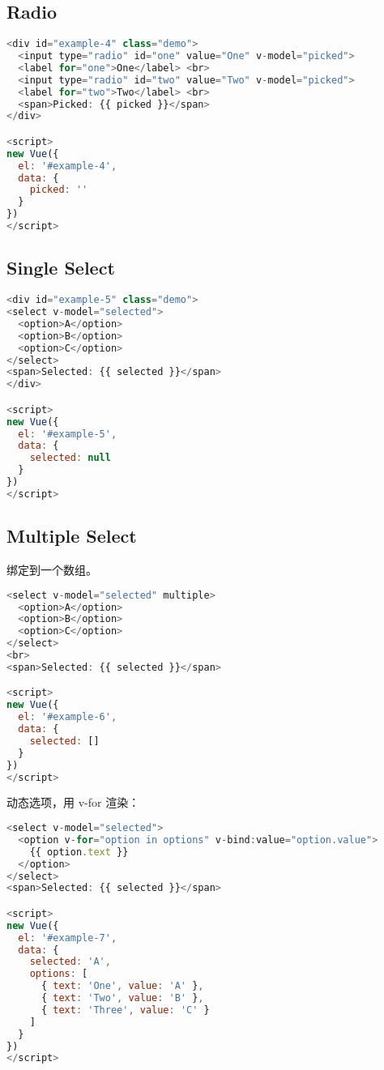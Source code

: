 \subsection{Radio}


\begin{lstlisting}[language=JavaScript]
<div id="example-4" class="demo">
  <input type="radio" id="one" value="One" v-model="picked"> 
  <label for="one">One</label> <br> 
  <input type="radio" id="two" value="Two" v-model="picked"> 
  <label for="two">Two</label> <br> 
  <span>Picked: {{ picked }}</span>
</div>

<script>
new Vue({
  el: '#example-4',
  data: {
    picked: ''
  }
})
</script>
\end{lstlisting}



\subsection{Single Select}



\begin{lstlisting}[language=JavaScript]
<div id="example-5" class="demo">
<select v-model="selected">
  <option>A</option> 
  <option>B</option> 
  <option>C</option>
</select> 
<span>Selected: {{ selected }}</span>
</div>

<script>
new Vue({
  el: '#example-5',
  data: {
    selected: null
  }
})
</script>
\end{lstlisting}


\subsection{Multiple Select}


绑定到一个数组。



\begin{lstlisting}[language=JavaScript]
<select v-model="selected" multiple>
  <option>A</option>
  <option>B</option>
  <option>C</option>
</select>
<br>
<span>Selected: {{ selected }}</span>

<script>
new Vue({
  el: '#example-6',
  data: {
    selected: []
  }
})
</script>
\end{lstlisting}

动态选项，用 v-for 渲染：


\begin{lstlisting}[language=JavaScript]
<select v-model="selected">
  <option v-for="option in options" v-bind:value="option.value">
    {{ option.text }}
  </option>
</select>
<span>Selected: {{ selected }}</span>

<script>
new Vue({
  el: '#example-7',
  data: {
    selected: 'A',
    options: [
      { text: 'One', value: 'A' },
      { text: 'Two', value: 'B' },
      { text: 'Three', value: 'C' }
    ]
  }
})
</script>
\end{lstlisting}

